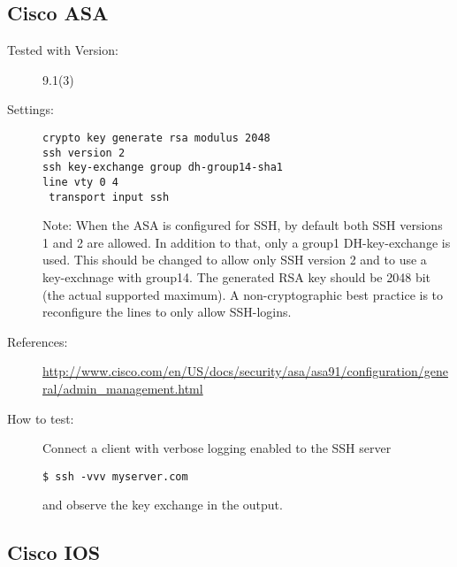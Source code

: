 \subsection{Cisco ASA}


\begin{description}
\item[Tested with Version:]9.1(3) 

\item[Settings:] \mbox{}
\begin{lstlisting}[breaklines]
crypto key generate rsa modulus 2048
ssh version 2
ssh key-exchange group dh-group14-sha1
line vty 0 4
 transport input ssh
\end{lstlisting}
Note: When the ASA is configured for SSH, by default both SSH versions 1 and 2 are allowed. In addition to that, only a group1 DH-key-exchange is used. This should be changed to allow only SSH version 2 and to use a key-exchnage with group14. The generated RSA key should be 2048 bit (the actual supported maximum). A non-cryptographic best practice is to reconfigure the lines to only allow SSH-logins.
\item[References:]
\url{http://www.cisco.com/en/US/docs/security/asa/asa91/configuration/general/admin\_management.html }


\item[How to test:]
Connect a client with verbose logging enabled to the SSH server \\
\begin{lstlisting}[breaklines]
$ ssh -vvv myserver.com
\end{lstlisting}and observe the key exchange in the output.
\end{description}


\subsection{Cisco IOS}


